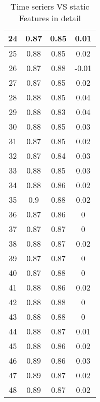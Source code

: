 \begin{table}[]
\begin{tabular}{|c|c c c|}
24   & 0.87              & 0.85         & 0.01       \\\hline
25   & 0.88              & 0.85         & 0.02       \\
26   & 0.87              & 0.88         & -0.01      \\
27   & 0.87              & 0.85         & 0.02       \\
28   & 0.88              & 0.85         & 0.04       \\
29   & 0.88              & 0.83         & 0.04       \\
30   & 0.88              & 0.85         & 0.03       \\\hline
31   & 0.87              & 0.85         & 0.02       \\
32   & 0.87              & 0.84         & 0.03       \\
33   & 0.88              & 0.85         & 0.03       \\
34   & 0.88              & 0.86         & 0.02       \\
35   & 0.9               & 0.88         & 0.02       \\
36   & 0.87              & 0.86         & 0          \\\hline
37   & 0.87              & 0.87         & 0          \\
38   & 0.88              & 0.87         & 0.02       \\
39   & 0.87              & 0.87         & 0          \\
40   & 0.87              & 0.88         & 0          \\
41   & 0.88              & 0.86         & 0.02       \\
42   & 0.88              & 0.88         & 0          \\\hline
43   & 0.88              & 0.88         & 0          \\
44   & 0.88              & 0.87         & 0.01       \\
45   & 0.88              & 0.86         & 0.02       \\
46   & 0.89              & 0.86         & 0.03       \\
47   & 0.89              & 0.87         & 0.02       \\
48   & 0.89              & 0.87         & 0.02      \\\hline

\end{tabular}
\caption{Time seriers VS static Features in detail}
\label{TSVSSFFULL}
\end{table}

